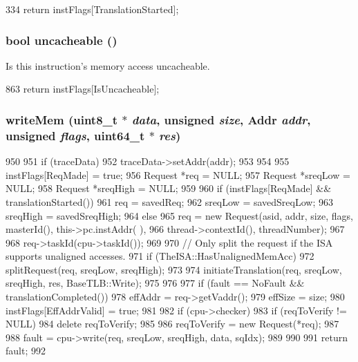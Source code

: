 \begin{DoxyCode}
334 { return instFlags[TranslationStarted]; }
\end{DoxyCode}
\hypertarget{classBaseDynInst_a21fc1eb6d0621763c50b19a1c0d25ca1}{
\subsubsection[{uncacheable}]{\setlength{\rightskip}{0pt plus 5cm}bool uncacheable ()}}
\label{classBaseDynInst_a21fc1eb6d0621763c50b19a1c0d25ca1}
Is this instruction's memory access uncacheable. 


\begin{DoxyCode}
863 { return instFlags[IsUncacheable]; }
\end{DoxyCode}
\hypertarget{classBaseDynInst_ad46c5edeb1ee9b60445f3e26364e2c5e}{
\subsubsection[{writeMem}]{ writeMem (uint8\_\-t $\ast$ {\em data}, \/  unsigned {\em size}, \/  {\bf Addr} {\em addr}, \/  unsigned {\em flags}, \/  uint64\_\-t $\ast$ {\em res})}}
\label{classBaseDynInst_ad46c5edeb1ee9b60445f3e26364e2c5e}



\begin{DoxyCode}
950 {
951     if (traceData) {
952         traceData->setAddr(addr);
953     }
954 
955     instFlags[ReqMade] = true;
956     Request *req = NULL;
957     Request *sreqLow = NULL;
958     Request *sreqHigh = NULL;
959 
960     if (instFlags[ReqMade] && translationStarted()) {
961         req = savedReq;
962         sreqLow = savedSreqLow;
963         sreqHigh = savedSreqHigh;
964     } else {
965         req = new Request(asid, addr, size, flags, masterId(), this->pc.instAddr(
      ),
966                           thread->contextId(), threadNumber);
967 
968         req->taskId(cpu->taskId());
969 
970         // Only split the request if the ISA supports unaligned accesses.
971         if (TheISA::HasUnalignedMemAcc) {
972             splitRequest(req, sreqLow, sreqHigh);
973         }
974         initiateTranslation(req, sreqLow, sreqHigh, res, BaseTLB::Write);
975     }
976 
977     if (fault == NoFault && translationCompleted()) {
978         effAddr = req->getVaddr();
979         effSize = size;
980         instFlags[EffAddrValid] = true;
981 
982         if (cpu->checker) {
983             if (reqToVerify != NULL) {
984                 delete reqToVerify;
985             }
986             reqToVerify = new Request(*req);
987         }
988         fault = cpu->write(req, sreqLow, sreqHigh, data, sqIdx);
989     }
990 
991     return fault;
992 }
\end{DoxyCode}


